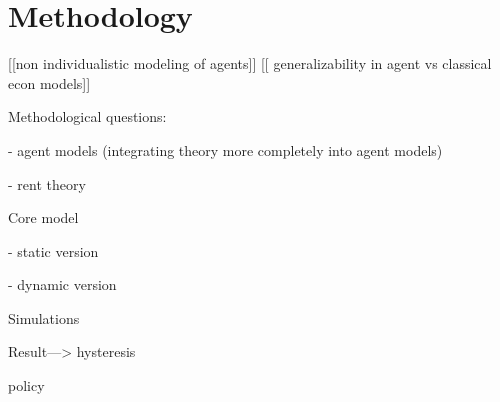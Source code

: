\chapter{Methodology}

[[non individualistic modeling of agents]] 
[[ generalizability in agent vs classical econ models]]

Methodological questions: 

    - agent models (integrating theory more completely into agent models)
    
    - rent theory

Core model

    - static version
    
    - dynamic version

Simulations

Result---> hysteresis

policy